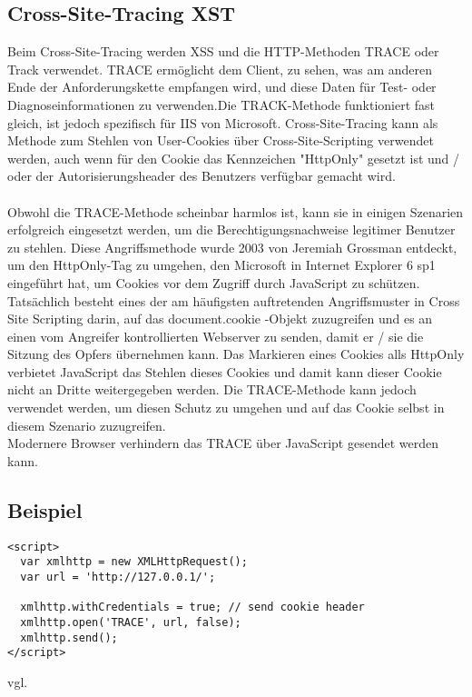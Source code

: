 {\subsection{Cross-Site-Tracing XST}
\label{sec:CSTXST}
Beim Cross-Site-Tracing werden XSS und die HTTP-Methoden TRACE oder Track verwendet. TRACE ermöglicht dem Client, zu sehen, was am anderen Ende der Anforderungskette empfangen wird, und diese Daten für Test- oder Diagnoseinformationen zu verwenden.Die TRACK-Methode funktioniert fast gleich, ist jedoch spezifisch für IIS von Microsoft. Cross-Site-Tracing kann als Methode zum Stehlen von User-Cookies über Cross-Site-Scripting verwendet werden, auch wenn für den Cookie das Kennzeichen "HttpOnly" gesetzt ist und / oder der Autorisierungsheader des Benutzers verfügbar gemacht wird.
\\ \\
Obwohl die TRACE-Methode scheinbar harmlos ist, kann sie in einigen Szenarien erfolgreich eingesetzt werden, um die Berechtigungsnachweise legitimer Benutzer zu stehlen. Diese Angriffsmethode wurde 2003 von Jeremiah Grossman entdeckt, um den HttpOnly-Tag zu umgehen, den Microsoft in Internet Explorer 6 sp1 eingeführt hat, um Cookies vor dem Zugriff durch JavaScript zu schützen. Tatsächlich besteht eines der am häufigsten auftretenden Angriffsmuster in Cross Site Scripting darin, auf das document.cookie -Objekt zuzugreifen und es an einen vom Angreifer kontrollierten Webserver zu senden, damit er / sie die Sitzung des Opfers übernehmen kann. Das Markieren eines Cookies alls HttpOnly verbietet JavaScript das Stehlen dieses Cookies und damit kann dieser Cookie nicht an Dritte weitergegeben werden. Die TRACE-Methode kann jedoch verwendet werden, um diesen Schutz zu umgehen und auf das Cookie selbst in diesem Szenario zuzugreifen.
\\
Modernere Browser verhindern das TRACE über JavaScript gesendet werden kann.
\pagebreak
\subsection{Beispiel}
\label{sec:cst_bsp}
\begin{lstlisting}
<script>
  var xmlhttp = new XMLHttpRequest();
  var url = 'http://127.0.0.1/';

  xmlhttp.withCredentials = true; // send cookie header
  xmlhttp.open('TRACE', url, false);
  xmlhttp.send();
</script>
\end{lstlisting}
vgl. \textcite{XST}
}
